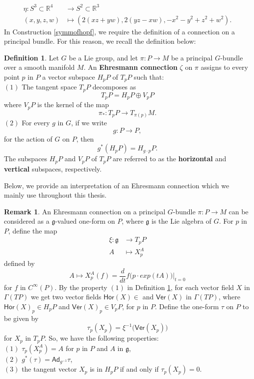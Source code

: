 \documentclass{article}
\theoremstyle{plain}
\theoremstyle{definition}
\newtheorem{defn}[thm]{Definition}
\newtheorem{rem}[thm]{Remark}
\begin{document}
\begin{align*}
\eta:S^3 \subset \mathbb{R}^4 &\longrightarrow S^2 \subset \mathbb{R}^3 \\
(x,y,z,w) &\longmapsto \left(2(xz+yw),2(yz-xw),-x^2-y^2+z^2+w^2\right).
\end{align*}
In Construction \ref{symmofhopf}, we require the definition of a connection on a principal bundle. For this reason, we recall the definition below:
\begin{defn}\cite{MR42768}\cite[Definition 6.1 on page 254]{MR1698234}\label{Ehresconn}
Let $G$ be a Lie group, and let $\pi:P \longrightarrow M$ be a principal $G$-bundle over a smooth manifold $M$. An \textbf{Ehresmann connection} $\zeta$ on $\pi$ assigns to every point $p$ in $P$ a vector subspace $H_p P$ of $T_p P$ such that: \\
$(1)$ The tangent space $T_p P$ decomposes as $$T_p P = H_p P \oplus V_p P$$
where $V_p P$ is the kernel of the map $$\pi_*:T_p P \longrightarrow T_{\pi(p)} M.$$
$(2)$ For every $g$ in $G$, if we write $$g:P \longrightarrow P,$$ for the action of $G$ on $P$, then $$g^*(H_p P) = H_{g \cdot p} P.$$
The subspaces $H_{p}P$ and $V_{p}P$ of $T_{p}P$ are referred to as the \textbf{horizontal} and \textbf{vertical} subspaces, respectively.
\end{defn}
Below, we provide an interpretation of an Ehresmann connection which we mainly use throughout this thesis.
\begin{rem}\cite{MR42768}\cite[Comments on page 254]{MR1698234}\label{equivconnpri}
An Ehresmann connection on a principal $G$-bundle $\pi:P \longrightarrow M$ can be considered as a $\mathfrak{g}$-valued one-form on $P$, where $\mathfrak{g}$ is the Lie algebra of $G$. For $p$ in $P$, define the map
\begin{align*}
\xi:\mathfrak{g} & \longrightarrow T_p P \\
A & \mapsto X^A_p
\end{align*}
defined by $$A \mapsto X^A_p(f)=\frac{d}{dt}f\bigl(p \cdot exp(tA)\bigr) \big\vert_{t = 0}$$
for $f$ in $C^\infty(P)$. By the property $(1)$ in Definition \ref{Ehresconn}, for each vector field $X$ in $\Gamma(TP)$ we get two vector fields $\mathsf{Hor}(X) \in $ and $\mathsf{Ver}(X)$ in $\Gamma(TP)$, where $\mathsf{Hor}(X)_p \in H_p P$ and $\mathsf{Ver}(X)_p \in V_p P$, for $p$ in $P$. Define the one-form $\tau$ on $P$ to be given by
$$\tau_p(X_p) = \xi^{-1}\bigl(\mathsf{Ver}(X_p)\bigr)$$
for $X_p$ in $T_p P$. So, we have the following properties: \\
$(1)$ $\tau_p(X^A_p) = A$ for $p$ in $P$ and $A$ in $\mathfrak{g}$, \\
$(2)$ $g^*(\tau) = \mathsf{Ad}_{g^{-1}} \tau$, \\
$(3)$ the tangent vector $X_p$ is in $H_p P$ if and only if $\tau_p(X_p) = 0$.
\end{rem}
\end{document}
